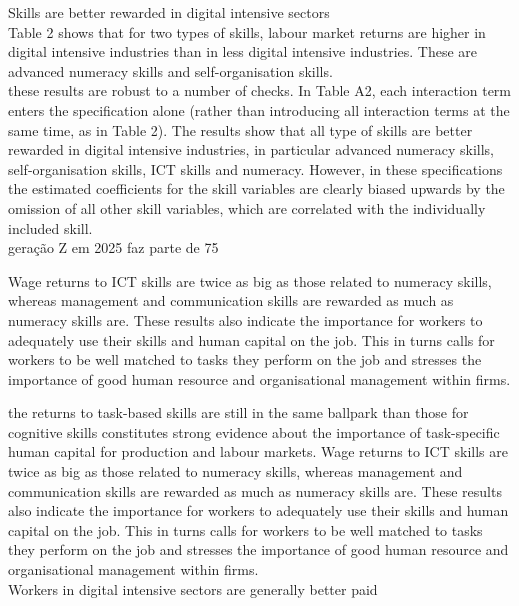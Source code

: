 Skills are better rewarded in digital intensive sectors\\

Table 2 shows that for two types of skills, labour market returns are higher in digital intensive industries than in less digital intensive industries. These are advanced numeracy skills and self-organisation skills.\\

these results are robust to a number of checks. In Table A2, each interaction term enters the specification alone (rather than introducing all interaction terms at the same time, as in Table 2). The results show that all type of skills are better rewarded in digital intensive industries, in particular advanced numeracy skills, self-organisation skills, ICT skills and numeracy. However, in these specifications the estimated coefficients for the skill variables are clearly biased upwards by the omission of all other skill variables, which are correlated with the individually included skill.\\

geração Z em 2025 faz parte de 75%

Wage returns to ICT skills are twice as big as those related to numeracy skills, whereas management and communication skills are rewarded as much as numeracy skills are. These results also indicate the importance for workers to adequately use their skills and human capital on the job. This in turns calls for workers to be well matched to tasks they perform on the job and stresses the importance of good human resource and organisational management within firms.

the returns to task-based skills are still in the same ballpark than those for cognitive skills constitutes strong evidence about the importance of task-specific human capital for production and labour markets. Wage returns to ICT skills are twice as big as those related to numeracy skills, whereas management and communication skills are rewarded as much as numeracy skills are. These results also indicate the importance for workers to adequately use their skills and human capital on the job. This in turns calls for workers to be well matched to tasks they perform on the job and stresses the importance of good human resource and organisational management within firms.\\

Workers in digital intensive sectors are generally better paid\\

